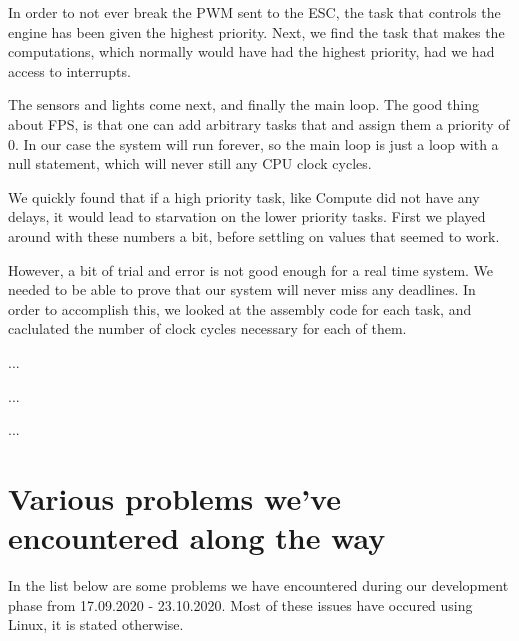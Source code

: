 \documentclass{article}
\begin{document}
In order to not ever break the PWM sent to the ESC, the task that controls the engine has been given the highest priority. Next, we find the task that makes the computations, which normally would have had the highest priority, had we had access to interrupts.

The sensors and lights come next, and finally the main loop. The good thing about FPS, is that one can add arbitrary tasks that and assign them a priority of 0. In our case the system will run forever, so the main loop is just a loop with a null statement, which will never still any CPU clock cycles.

We quickly found that if a high priority task, like Compute did not have any delays, it would lead to starvation on the lower priority tasks. First we played around with these numbers a bit, before settling on values that seemed to work.

However, a bit of trial and error is not good enough for a real time system. We needed to be able to prove that our system will never miss any deadlines. In order to accomplish this, we looked at the assembly code for each task, and caclulated the number of clock cycles necessary for each of them.

...

...

...



\section{Various problems we've encountered along the way}
In the list below are some problems we have encountered during our development phase from 17.09.2020 - 23.10.2020. Most of these issues have occured using Linux, it is stated otherwise.
\end{document}
